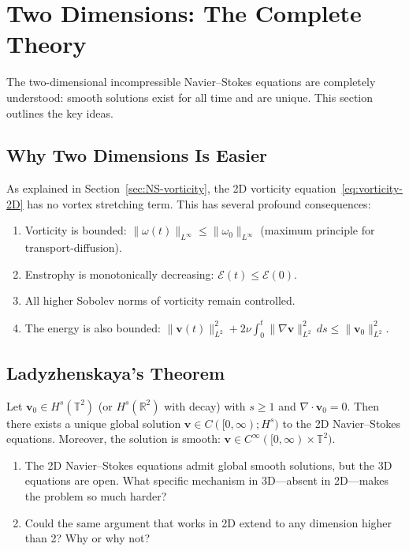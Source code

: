 \section{Two Dimensions: The Complete Theory}
\label{sec:NS-2D}

The two-dimensional incompressible Navier--Stokes equations are completely understood: smooth solutions exist for all time and are unique. This section outlines the key ideas.

\subsection{Why Two Dimensions Is Easier}

As explained in Section~\ref{sec:NS-vorticity}, the 2D vorticity equation~\eqref{eq:vorticity-2D} has no vortex stretching term. This has several profound consequences:
\begin{enumerate}
\item Vorticity is bounded: $\|\omega(t)\|_{L^\infty} \le \|\omega_0\|_{L^\infty}$ (maximum principle for transport-diffusion).
\item Enstrophy is monotonically decreasing: $\mathcal{E}(t) \le \mathcal{E}(0)$.
\item All higher Sobolev norms of vorticity remain controlled.
\item The energy is also bounded: $\|\mathbf{v}(t)\|_{L^2}^2 + 2\nu \int_0^t \|\nabla \mathbf{v}\|_{L^2}^2 \, ds \le \|\mathbf{v}_0\|_{L^2}^2$.
\end{enumerate}

\subsection{Ladyzhenskaya's Theorem}

\begin{theorem}[Ladyzhenskaya, 1959]
\label{thm:ladyzhenskaya}
Let $\mathbf{v}_0 \in H^s(\mathbb{T}^2)$ (or $H^s(\mathbb{R}^2)$ with decay) with $s \ge 1$ and $\nabla \cdot \mathbf{v}_0 = 0$. Then there exists a unique global solution $\mathbf{v} \in C([0, \infty); H^s)$ to the 2D Navier--Stokes equations. Moreover, the solution is smooth: $\mathbf{v} \in C^\infty([0, \infty) \times \mathbb{T}^2)$.
\end{theorem}

\begin{checkyou}
\begin{enumerate}
\item The 2D Navier--Stokes equations admit global smooth solutions, but the 3D equations are open. What specific mechanism in 3D---absent in 2D---makes the problem so much harder?
\item Could the same argument that works in 2D extend to any dimension higher than 2? Why or why not?
\end{enumerate}
\end{checkyou}

